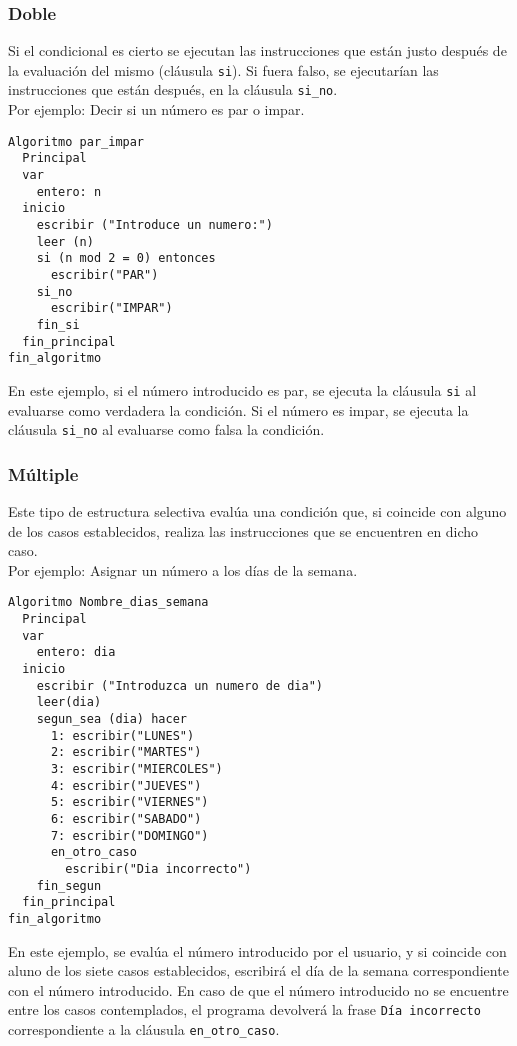 \documentclass[12pt,letterpaper]{article}
\begin{document}
\subsubsection{Doble}

Si el condicional es cierto se ejecutan las instrucciones que están justo después de la evaluación del mismo (cláusula \texttt{si}). Si fuera falso, se ejecutarían las instrucciones que están después, en la cláusula \texttt{si\_no}.\\
Por ejemplo: Decir si un número es par o impar.
\begin{lstlisting}
Algoritmo par_impar
  Principal
  var
    entero: n
  inicio
    escribir ("Introduce un numero:")
    leer (n)
    si (n mod 2 = 0) entonces
      escribir("PAR")
    si_no
      escribir("IMPAR")
    fin_si
  fin_principal
fin_algoritmo
\end{lstlisting}
En este ejemplo, si el número introducido es par, se ejecuta la cláusula \texttt{si} al evaluarse como verdadera la condición. Si el número es impar, se ejecuta la cláusula \texttt{si\_no} al evaluarse como falsa la condición.

\subsubsection{Múltiple}

Este tipo de estructura selectiva evalúa una condición que, si coincide con alguno de los casos establecidos, realiza las instrucciones que se encuentren en dicho caso.\\
Por ejemplo: Asignar un número a los días de la semana.
\begin{lstlisting}
Algoritmo Nombre_dias_semana
  Principal
  var
    entero: dia
  inicio
    escribir ("Introduzca un numero de dia")
    leer(dia)
    segun_sea (dia) hacer
      1: escribir("LUNES")
      2: escribir("MARTES")
      3: escribir("MIERCOLES")
      4: escribir("JUEVES")
      5: escribir("VIERNES")
      6: escribir("SABADO")
      7: escribir("DOMINGO")
      en_otro_caso
        escribir("Dia incorrecto")
    fin_segun
  fin_principal
fin_algoritmo
\end{lstlisting}
En este ejemplo, se evalúa el número introducido por el usuario, y si coincide con aluno de los siete casos establecidos, escribirá el día de la semana correspondiente con el número introducido. En caso de que el número introducido no se encuentre entre los casos contemplados, el programa devolverá la frase \texttt{Día incorrecto} correspondiente a la cláusula \texttt{en\_otro\_caso}.
\end{document}
